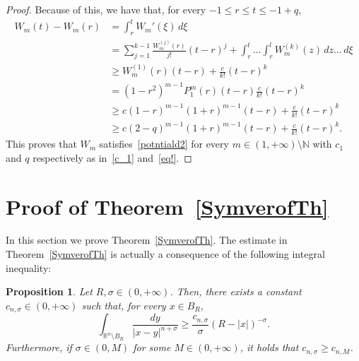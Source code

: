 \documentclass[12pt]{article}
\newcommand{\R}{\mathbb{R}}
\newcommand{\N}{\mathbb{N}}
\numberwithin{equation}{section}
\newtheorem{prop}[thm]{Proposition}
\renewcommand{\leq}{\leqslant}
\renewcommand{\geq}{\geqslant}
\begin{document}
\begin{appendix}
\begin{proof}
Because of this, we have that, for every $-1\leq r\leq t\leq -1+q$,
\begin{equation*}
\begin{split}
W_m(t)-W_m(r)&=\int_{r}^tW_m'(\xi)\,d\xi\\
&=\sum_{j=1}^{k-1} \frac{W_m^{(j)}(r)}{j!}(t-r)^j+\int_{r}^t\dots \int_{r}^l W_m^{(k)}(z)\,dz\dots\,d\xi\\
&\geq W_m^{(1)}(r)(t-r)  + \frac{c}{k!}(t-r)^k\\
&=(1-r^2)^{m-1}P_1^m(r)(t-r) \frac{c}{k!}(t-r)^k\\
&\geq c(1-r)^{m-1}(1+r)^{m-1}(t-r)+\frac{c}{k!}(t-r)^k\\
&\geq c(2-q)^{m-1}(1+r)^{m-1}(t-r)+\frac{c}{k!}(t-r)^k.
\end{split}
\end{equation*}
This proves that $W_{m}$ satisfies~\eqref{potntiald2} for every $m\in (1,+\infty)\setminus \N$ with $c_1$ and $q$ respectively as in~\eqref{c_1} and~\eqref{eq!}.  
\end{proof}



\section{Proof of Theorem~\ref{SymverofTh}}\label{Crocodilewalk}
In this section we prove Theorem~\ref{SymverofTh}. 
The estimate in Theorem~\ref{SymverofTh} is actually a consequence of the following integral inequality: 
\begin{prop}\label{AmGiDiMe}
Let $R,\sigma\in (0,+\infty)$. Then, there exists a constant $c_{n,\sigma}\in (0,+\infty)$
such that, for every $x\in B_{R}$, 
\begin{equation}\label{hloiacrca}
\int_{\R^n\setminus B_R}\frac{dy}{\left|x-y\right|^{n+\sigma}}\geq \frac{c_{n,\sigma}}{\sigma}(R-\left|x\right|)^{-\sigma}.
\end{equation}
Furthermore, if $\sigma\in(0,M)$ for some $M\in(0,+\infty)$, it holds that $c_{n,\sigma}\geq c_{n,M}$.
\end{prop}


\end{appendix}
\end{document}
